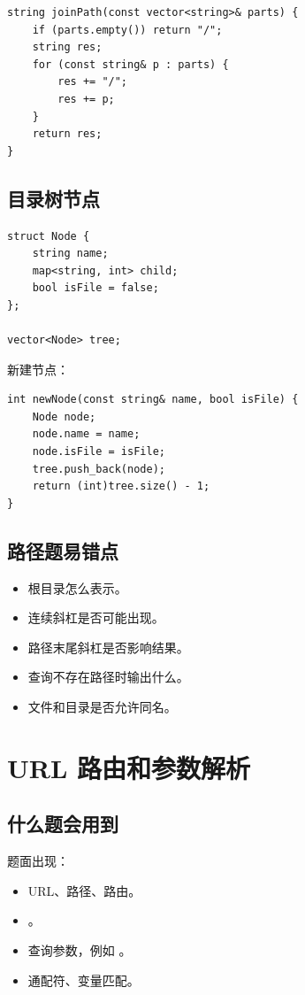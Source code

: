 \begin{lstlisting}
string joinPath(const vector<string>& parts) {
    if (parts.empty()) return "/";
    string res;
    for (const string& p : parts) {
        res += "/";
        res += p;
    }
    return res;
}
\end{lstlisting}

\subsection{目录树节点}

\begin{lstlisting}
struct Node {
    string name;
    map<string, int> child;
    bool isFile = false;
};

vector<Node> tree;
\end{lstlisting}

新建节点：

\begin{lstlisting}
int newNode(const string& name, bool isFile) {
    Node node;
    node.name = name;
    node.isFile = isFile;
    tree.push_back(node);
    return (int)tree.size() - 1;
}
\end{lstlisting}

\subsection{路径题易错点}

\begin{itemize}
  \item 根目录怎么表示。
  \item 连续斜杠是否可能出现。
  \item 路径末尾斜杠是否影响结果。
  \item 查询不存在路径时输出什么。
  \item 文件和目录是否允许同名。
\end{itemize}

\section{URL 路由和参数解析}\label{sec:07-19}

\subsection{什么题会用到}

题面出现：

\begin{itemize}
  \item URL、路径、路由。
  \item {}。
  \item 查询参数，例如 。
  \item 通配符、变量匹配。
\end{itemize}

